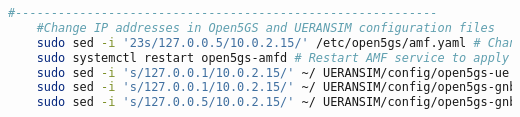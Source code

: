 \begin{lstlisting}[language=Bash, caption=Script]
    #-----------------------------------------------------------
    #Change IP addresses in Open5GS and UERANSIM configuration files
    sudo sed -i '23s/127.0.0.5/10.0.2.15/' /etc/open5gs/amf.yaml # Change AMF IP address
    sudo systemctl restart open5gs-amfd # Restart AMF service to apply changes
    sudo sed -i 's/127.0.0.1/10.0.2.15/' ~/ UERANSIM/config/open5gs-ue.yaml # Change UE IP address
    sudo sed -i 's/127.0.0.1/10.0.2.15/' ~/ UERANSIM/config/open5gs-gnb.yaml # Change gNB IP address
    sudo sed -i 's/127.0.0.5/10.0.2.15/' ~/ UERANSIM/config/open5gs-gnb.yaml # Change gNB AMF IP address
\end{lstlisting}